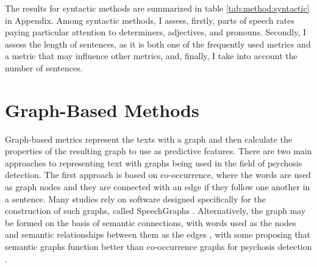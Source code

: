 The results for syntactic methods are summarized in table \ref{tab:method:syntactic} in Appendix. Among syntactic methods, I assess, firstly, parts of speech rates paying particular attention to determiners, adjectives, and pronouns. Secondly, I assess the length of sentences, as it is both one of the frequently used metrics and a metric that may influence other metrics, and, finally, I take into account the number of sentences.

\section{Graph-Based Methods}
\label{sec:review:graph}



Graph-based metrics represent the texts with a graph and then calculate the properties of the resulting graph to use as predictive features. There are two main approaches to representing text with graphs being used in the field of psychosis detection. The first approach is based on co-occurrence, where the words are used as graph nodes and they are connected with an edge if they follow one another in a sentence. Many studies rely on software designed specifically for the construction of such graphs, called SpeechGraphs \citep{mota2012speech, mota2014graph}. Alternatively, the graph may be formed on the basis of semantic connections, with words used as the nodes and semantic relationships between them as the edges \citep{nikzad2022does, nettekoven2023semantic}, with some proposing that semantic graphs function better than co-occurrence graphs for psychosis detection \citep{nikzad2022does}.

